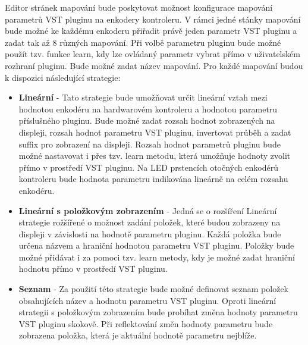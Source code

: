 \documentclass[thesis=M,czech]{FITthesis}[2019/03/06]
\begin{document}
		Editor stránek mapování bude poskytovat možnost konfigurace mapování parametrů VST pluginu na enkodery kontroleru.
		V rámci jedné stánky mapování bude možné ke každému enkoderu přiřadit právě jeden parametr VST pluginu a zadat tak až 8 různých mapování.
		Při volbě parametru pluginu bude možné použít tzv. funkce learn, kdy lze ovládaný parametr vybrat přímo v uživatelském rozhraní pluginu.
		Bude možné zadat název mapování.
		Pro každé mapování budou k dispozici následující strategie:
		\begin{itemize}
			\item\label{LinearMappingStrategy} \textbf{Lineární} - Tato strategie bude umožňovat určit lineární vztah mezi hodnotou enkodéru na hardwarovém kontroleru 
			a hodnotou parametru příslušného pluginu. Bude možné zadat rozsah hodnot zobrazených na displeji, rozsah hodnot parametru VST pluginu, invertovat
			průběh a zadat suffix pro zobrazení na displeji. Rozsah hodnot parametrů pluginu bude možné nastavovat i přes tzv. learn metodu, která 
			umožňuje hodnoty zvolit přímo v prostředí VST pluginu. Na LED prstencích otočných enkodérů kontroleru bude hodnota parametru indikována lineárně na celém rozsahu enkodéru.
			
			\item \textbf{Lineární s položkovým zobrazením} - Jedná se o rozšíření Lineární strategie rožšířené o možnost zadání položek, které
			budou zobrazeny na displeji v závislosti na hodnotě parametru pluginu. Každá položka bude určena názvem a hraniční hodnotou parametru VST pluginu.
			Položky bude možné přidávat i za pomoci tzv. learn metody, kdy je možné zadat hraniční hodnotu přímo v prostředí VST pluginu.

			\item \textbf{Seznam} - Za použití této strategie bude možné definovat seznam položek obsahujících název a hodnotu parametru VST pluginu.
			Oproti lineární strategii s položkovým zobrazením bude probíhat změna hodnoty parametru VST pluginu skokově. Při reflektování změn hodnoty parametru bude zobrazena
			položka, která je aktuální hodnotě parametru nejblíže.
		\end{itemize}
		
\end{document}
